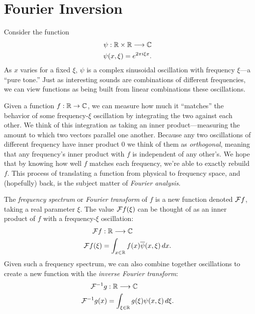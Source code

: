 
  \chapter{Fourier Inversion}
  \label{ch:fourier}

    Consider the function
    \begin{align*}
      \psi:\mathbb{R}\times\mathbb{R}\longrightarrow\mathbb{C}\\
      \psi(x,\xi) = e^{2\pi i \xi x} \text{.}
    \end{align*}
    As $x$ varies for a fixed $\xi$, $\psi$ is a complex sinusoidal oscillation with frequency $\xi$\footnotemark---a ``pure tone.''
    Just as interesting sounds are combinations of different frequencies, we can view functions as being built from linear combinations these oscillations.

    Given a function $f:\mathbb{R}\rightarrow\mathbb{C}$, we can measure how much it ``matches'' the behavior of some frequency-$\xi$ oscillation by integrating the two against each other.
    We think of this integration as taking an inner product---measuring the amount to which two vectors parallel one another.
    Because any two oscillations of different frequency have inner product 0 we think of them as \emph{orthogonal}, meaning that any frequency's inner product with $f$ is independent of any other's.
    We hope that by knowing how well $f$ matches each frequency, we're able to exactly rebuild $f$.
    This process of translating a function from physical to frequency space, and (hopefully) back, is the subject matter of \emph{Fourier analysis}.

    \begin{defn}
      The \emph{frequency spectrum} or \emph{Fourier transform} of $f$ is a new function denoted $\mathcal{F} f$, taking a real parameter $\xi$.
      The value $\mathcal{F} f(\xi)$ can be thought of as an inner product of $f$ with a frequency-$\xi$ oscillation:
      \begin{align*}
        \mathcal{F} f&:\mathbb{R}\longrightarrow\mathbb{C}\\
        \mathcal{F} f(\xi) &= \int_{x\in\mathbb{R}} f(x)\overline\psi(x,\xi)\,dx \text{.}
      \end{align*}
      Given such a frequency spectrum, we can also combine together oscillations to create a new function with the \emph{inverse Fourier transform}:
      \begin{align*}
        \mathcal{F}^{-1}g&:\mathbb{R}\longrightarrow\mathbb{C}\\
        \mathcal{F}^{-1}g(x) &= \int_{\xi\in\mathbb{R}} g(\xi)\psi(x,\xi)\,d\xi \text{.}
      \end{align*}
    \end{defn}

